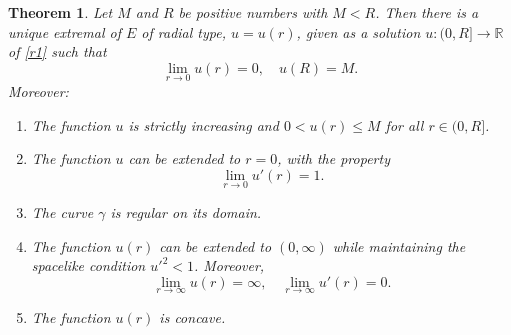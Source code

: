\documentclass[10pt,a4paper]{amsart}
\newtheorem{theorem}{Theorem}
\def\r{\mathbb R}
\begin{document}
\begin{theorem}\label{t51}
 Let $M$ and $R$ be positive numbers with $M<R$. Then there is a unique extremal of $E$ of radial type, $u=u(r)$, given as a solution $u \colon (0,R]\to\r$  of \eqref{r1} such that 
\begin{equation}\label{c1}\lim_{r\to 0}u(r)=0,\quad u(R)=M.
\end{equation}
Moreover: 
\begin{enumerate}
\item  The function $u$ is strictly increasing and $0< u(r)\leq M$ for all $r\in (0,R]$.
\item The function $u$ can be extended to   $r=0$, with the property 
$$\lim_{r\to 0}u'(r)=1.$$
\item The curve $\gamma $ is regular   on its  domain.
\item The function $u(r)$ can be extended to $(0,\infty)$ while maintaining  the spacelike condition $u'^2<1$. Moreover, 
$$\lim_{r\to \infty}u(r)=\infty,\quad  \lim_{r\to \infty}u'(r)=0.$$
\item The function $u(r)$ is concave. 
\end{enumerate} 
\end{theorem}
\end{document}
